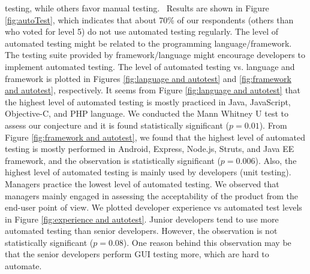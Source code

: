 testing, while others favor manual testing.  Results are shown in Figure
\ref{fig:autoTest}, which indicates that about 70\% of our respondents (others
than who voted for level 5) do not use automated testing regularly. The level of
automated testing might be related to the programming language/framework. The
testing suite provided by framework/language might encourage developers to
implement automated testing. The level of automated testing vs. language and
framework is plotted in Figures \ref{fig:language and autotest} and
\ref{fig:framework and autotest}, respectively. It seems from Figure
\ref{fig:language and autotest} that the highest level of automated testing is
mostly practiced in Java, JavaScript, Objective-C, and PHP language. We
conducted the Mann Whitney U test to assess our conjecture and it is found
statistically significant ($p=0.01$). From Figure \ref{fig:framework and
autotest}, we found that the highest level of automated testing is mostly
performed in Android, Express, Node.js, Struts, and Java EE framework, and the
observation is statistically significant ($p=0.006$). Also, the highest level of
automated testing is mainly used by developers (unit testing). 
Managers practice the lowest level of automated testing. We observed that managers mainly engaged in assessing the
acceptability of the product from the end-user point of view. We plotted developer experience vs automated test levels in
Figure \ref{fig:experience and autotest}. Junior developers tend to use more automated testing than senior
developers. However, the observation is not statistically significant
($p=0.08$). One reason behind this observation may be that the senior
developers perform GUI testing more, which are hard to
automate.


